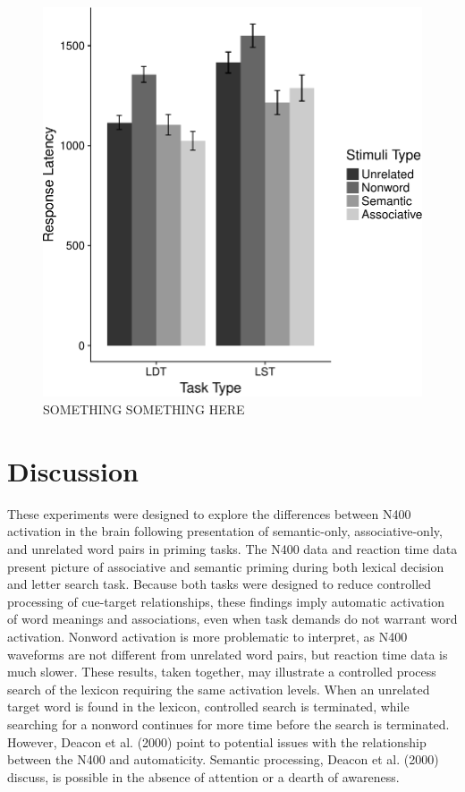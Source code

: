 \documentclass[english,man]{apa6}
\theoremstyle{definition}
\theoremstyle{definition}
\theoremstyle{definition}
\theoremstyle{remark}
\begin{document}
\begin{figure}
\centering
\includegraphics{BrainPaper_files/figure-latex/RT-graph-1.pdf}
\caption{\label{fig:RT-graph}SOMETHING SOMETHING HERE}
\end{figure}

\section{Discussion}\label{discussion}

These experiments were designed to explore the differences between N400
activation in the brain following presentation of semantic-only,
associative-only, and unrelated word pairs in priming tasks. The N400
data and reaction time data present picture of associative and semantic
priming during both lexical decision and letter search task. Because
both tasks were designed to reduce controlled processing of cue-target
relationships, these findings imply automatic activation of word
meanings and associations, even when task demands do not warrant word
activation. Nonword activation is more problematic to interpret, as N400
waveforms are not different from unrelated word pairs, but reaction time
data is much slower. These results, taken together, may illustrate a
controlled process search of the lexicon requiring the same activation
levels. When an unrelated target word is found in the lexicon,
controlled search is terminated, while searching for a nonword continues
for more time before the search is terminated. However, Deacon et al.
(2000) point to potential issues with the relationship between the N400
and automaticity. Semantic processing, Deacon et al. (2000) discuss, is
possible in the absence of attention or a dearth of awareness.
\end{document}
